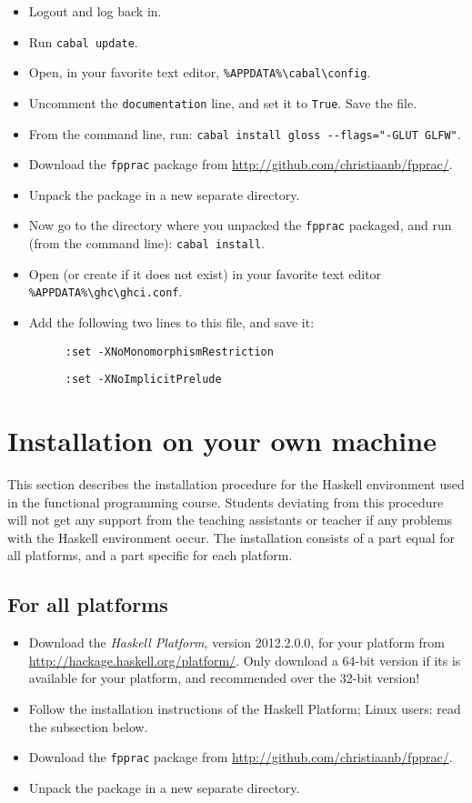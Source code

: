 \documentclass[]{article}
\begin{document}
\begin{itemize}
  \item Logout and log back in.
  \item Run \texttt{cabal update}.
  \item Open, in your favorite text editor, \texttt{\%APPDATA\%\textbackslash{}cabal\textbackslash{}config}.
  \item Uncomment the \texttt{documentation} line, and set it to \texttt{True}. Save the file.
  \item From the command line, run: \texttt{cabal install gloss -{}-flags="-GLUT GLFW"}.
  \item Download the \texttt{fpprac} package from \url{http://github.com/christiaanb/fpprac/}.
  \item Unpack the package in a new separate directory.
  \item Now go to the directory where you unpacked the \texttt{fpprac} packaged, and run (from the command line): \texttt{cabal install}.
  \item Open (or create if it does not exist) in your favorite text editor \texttt{\%APPDATA\%\textbackslash{}ghc\textbackslash{}ghci.conf}.
  \item Add the following two lines to this file, and save it:
  \begin{description}
    \item[] \texttt{:set -XNoMonomorphismRestriction}
    \item[] \texttt{:set -XNoImplicitPrelude}
  \end{description}
\end{itemize}

\section{Installation on your own machine}
This section describes the installation procedure for the Haskell environment used in the functional programming course.
Students deviating from this procedure will not get any support from the teaching assistants or teacher if any problems with the Haskell environment occur.
The installation consists of a part equal for all platforms, and a part specific for each platform.

\subsection{For all platforms}
\begin{itemize}
  \item Download the \emph{Haskell Platform}, version 2012.2.0.0, for your platform from \url{http://hackage.haskell.org/platform/}. Only download a 64-bit version if its is available for your platform, and recommended over the 32-bit version!
  \item Follow the installation instructions of the Haskell Platform; Linux users: read the subsection below.
  \item Download the \texttt{fpprac} package from \url{http://github.com/christiaanb/fpprac/}.
  \item Unpack the package in a new separate directory.
\end{itemize}
\end{document}
